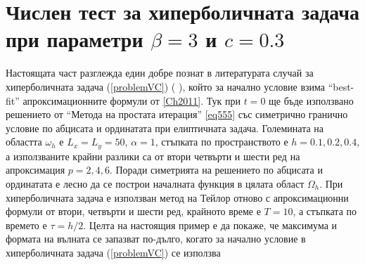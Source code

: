 \documentclass{article}
\newcommand{\rf}[1]{(\ref{#1})}
\begin{document}
\section{Числен тест за хиперболичната задача при параметри $\beta = 3$ и $c=0.3$}
Настоящата част разглежда един добре познат в литературата случай за хиперболичната задача \rf{problemVC} ( \cite{ref21, dani, milenaDani, ref22} ), който за начално условие взима ``best-fit'' апроксимационните формули от \ref{Ch2011}. Тук при $t=0$ ще бъде използвано решението от ``Метода на простата итерация'' \ref{eq555} със симетрично гранично условие по абцисата и ординатата при елиптичната задача. Големината на областта $\omega_h$ е $L_x = L_y = 50$, $\alpha = 1$, стъпката по пространството е $h=0.1, 0.2, 0.4$, а използваните крайни разлики са от втори четвърти и шести ред на апроксимация $p=2, 4, 6$. Поради симетрията на решението по абцисата и ординатата е лесно да се построи началната функция в цялата област $\Omega_h$. При хиперболичната задача е използван метод на Тейлор отново с апроксимационни формули от втори, четвърти и шести ред, крайното време е $T=10$, а стъпката по времето е $\tau = h/2$. Целта на настоящия пример е да покаже, че максимума и формата на вълната се запазват по-дълго, когато за начално условие в хиперболичната задача \rf{problemVC} се използва 
\end{document}
